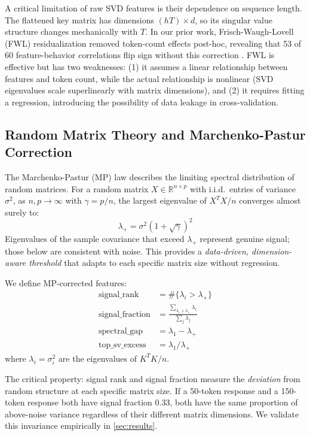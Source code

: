 A critical limitation of raw SVD features is their dependence on sequence
length. The flattened key matrix has dimensions $(hT) \times d$, so its
singular value structure changes mechanically with $T$. In our prior work,
Frisch-Waugh-Lovell (FWL) residualization removed token-count effects
post-hoc, revealing that 53 of 60 feature-behavior correlations flip sign
without this correction \citep{lyra2026detecting}. FWL is effective but has
two weaknesses: (1) it assumes a linear relationship between features and
token count, while the actual relationship is nonlinear (SVD eigenvalues
scale superlinearly with matrix dimensions), and (2) it requires fitting a
regression, introducing the possibility of data leakage in cross-validation.

\subsection{Random Matrix Theory and Marchenko-Pastur Correction}

The Marchenko-Pastur (MP) law \citep{marchenko1967distribution} describes
the limiting spectral distribution of random matrices. For a random matrix
$X \in \mathbb{R}^{n \times p}$ with i.i.d.\ entries of variance
$\sigma^2$, as $n, p \to \infty$ with $\gamma = p/n$, the largest
eigenvalue of $X^T X / n$ converges almost surely to:
\begin{equation}\label{eq:mp_threshold}
  \lambda_+ = \sigma^2 (1 + \sqrt{\gamma})^2
\end{equation}
Eigenvalues of the sample covariance that exceed $\lambda_+$ represent
genuine signal; those below are consistent with noise. This provides a
\emph{data-driven, dimension-aware threshold} that adapts to each specific
matrix size without regression.

We define MP-corrected features:
\begin{align}
  \text{signal\_rank} &= \#\{\lambda_i > \lambda_+\} \label{eq:signal_rank} \\
  \text{signal\_fraction} &= \frac{\sum_{\lambda_i > \lambda_+} \lambda_i}{\sum_j \lambda_j} \label{eq:signal_frac} \\
  \text{spectral\_gap} &= \lambda_1 - \lambda_+ \label{eq:spectral_gap} \\
  \text{top\_sv\_excess} &= \lambda_1 / \lambda_+ \label{eq:sv_excess}
\end{align}
where $\lambda_i = \sigma_i^2$ are the eigenvalues of $K^T K / n$.

The critical property: signal rank and signal fraction measure the
\emph{deviation} from random structure at each specific matrix size.
If a 50-token response and a 150-token response both have signal fraction
0.33, both have the same proportion of above-noise variance regardless
of their different matrix dimensions. We validate this invariance
empirically in \cref{sec:results}.

